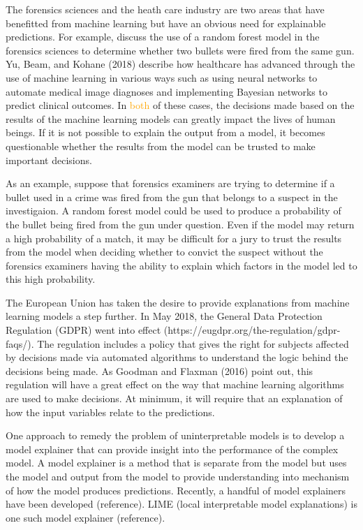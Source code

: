 \documentclass[AMS,STIX2COL]{WileyNJD-v2}
\newcommand{\hh}[1]{\textcolor{orange}{#1}}
\begin{document}
The forensics sciences and the heath care industry are two areas that have benefitted from machine learning but have an obvious need for explainable predictions. For example, \citet{aoas} discuss the use of a random forest model in the forensics sciences to determine whether two bullets were fired from the same gun. Yu, Beam, and Kohane (2018) describe how healthcare has advanced through the use of machine learning in various ways such as using neural networks to automate medical image diagnoses and implementing Bayesian networks to predict clinical outcomes. In \hh{both} of these cases, the decisions made based on the results of the machine learning models can greatly impact the lives of human beings. If it is not possible to explain the output from a model, it becomes questionable whether the results from the model can be trusted to make important decisions.

As an example, suppose that forensics examiners are trying to determine if a bullet used in a crime was fired from the gun that belongs to a suspect in the investigaion. A random forest model could be used to produce a probability of the bullet being fired from the gun under question. Even if the model may return a high probability of a match, it may be difficult for a jury to trust the results from the model when deciding whether to convict the suspect without the forensics examiners having the ability to explain which factors in the model led to this high probability.

The European Union has taken the desire to provide explanations from machine learning models a step further. In May 2018, the General Data Protection Regulation (GDPR) went into effect (https://eugdpr.org/the-regulation/gdpr-faqs/). The regulation includes a policy that gives the right for subjects affected by decisions made via automated algorithms to understand the logic behind the decisions being made. As Goodman and Flaxman (2016) point out, this regulation will have a great effect on the way that machine learning algorithms are used to make decisions. At minimum, it will require that an explanation of how the input variables relate to the predictions.

One approach to remedy the problem of uninterpretable models is to develop a model explainer that can provide insight into the performance of the complex model. A model explainer is a method that is separate from the model but uses the model and output from the model to provide understanding into mechanism of how the model produces predictions. Recently, a handful of model explainers have been developed (reference). LIME (local interpretable model explanations) is one such model explainer (reference).
\end{document}
